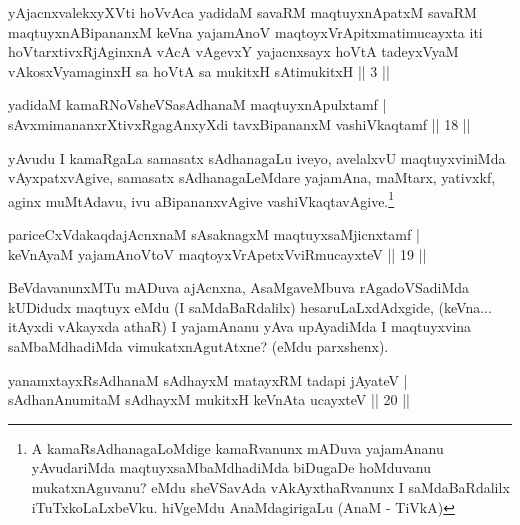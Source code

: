 
\begin{kandikeshl}
yAjacnxvalekxyXVti hoVvAca yadidaM savaRM maqtuyxnApatxM savaRM maqtuyxnABipananxM keVna yajamAnoV maqtoyxVrApitxmatimucayxta iti hoVtarxtivxRjAginxnA vAcA vAgevxY yajacnxsayx hoVtA tadeyxVyaM vAkosxV\s yamaginxH sa hoVtA sa mukitxH sAtimukitxH || 3 ||
\end{kandikeshl}


\begin{shl}
yadidaM kamaRNoV\s sheVSasAdhanaM maqtuyxnA\s \s pulxtamf |\\
sAvxmimananxrXtivxRgagAnxyXdi tavxBipananxM vashiVkaqtamf \hfill || 18 ||
\end{shl}

\begin{artha}
yAvudu I kamaRgaLa samasatx sAdhanagaLu iveyo, avelalxvU maqtuyxviniMda vAyxpatxvAgive, samasatx sAdhanagaLeMdare yajamAna, maMtarx, yativxkf, aginx muMtAdavu, ivu aBipananxvAgive vashiVkaqtavAgive.\footnote{A kamaRsAdhanagaLoMdige kamaRvanunx mADuva yajamAnanu yAvudariMda maqtuyxsaMbaMdhadiMda biDugaDe hoMduvanu mukatxnAguvanu? eMdu sheVSavAda vAkAyxthaRvanunx I saMdaBaRdalilx iTuTxkoLaLxbeVku. hiVgeMdu AnaMdagirigaLu (AnaM - TiVkA)}
\end{artha}


\begin{shl}
pariceCxVdakaqdajAcnxnaM sAsaknagxM maqtuyxsaMjicnxtamf |\\
keVnAyaM yajamAnoV\s toV maqtoyxVrApetxVviRmucayxteV \hfill || 19 ||
\end{shl}

\begin{artha}
BeVdavanunxMTu mADuva ajAcnxna, AsaMgaveMbuva rAgadoVSadiMda kUDidudx maqtuyx eMdu (I saMdaBaRdalilx) hesaruLaLxdAdxgide, (keVna... itAyxdi vAkayxda athaR) I yajamAnanu yAva upAyadiMda I maqtuyxvina saMbaMdhadiMda vimukatxnAgutAtxne? (eMdu parxshenx).
\end{artha}


\begin{shl}
yanamxtayxRsAdhanaM sAdhayxM matayxRM tadapi jAyateV |\\
sAdhanAnumitaM sAdhayxM mukitxH keVnAta ucayxteV \hfill || 20 ||
\end{shl}


